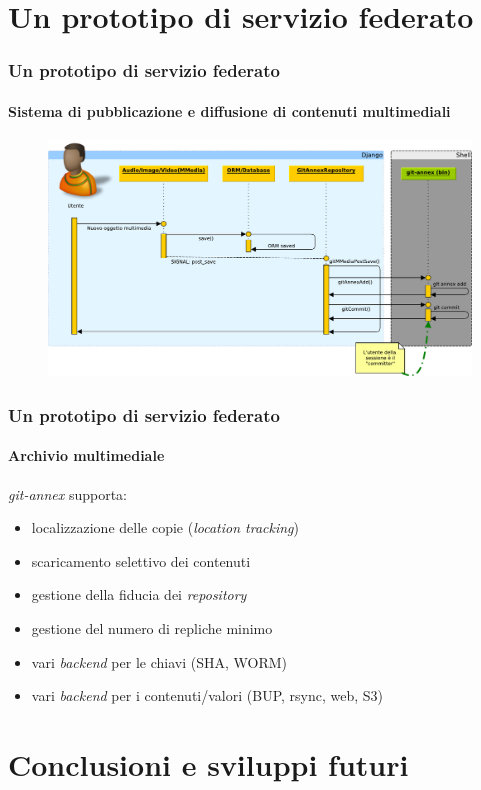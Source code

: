 \documentclass{beamer}
\begin{document}
\section{Un prototipo di servizio federato}

\begin{frame}
  \frametitle{Un prototipo di servizio federato}
  \framesubtitle{Sistema di pubblicazione e diffusione di contenuti multimediali}
	\begin{figure}
		\includegraphics[width=\textwidth]{./Figure/SequenceDiagram_NuovoOggetto-crop.pdf}
	\end{figure}
\end{frame}

\begin{frame}
  \frametitle{Un prototipo di servizio federato}
  \framesubtitle{Archivio multimediale}
\emph{git-annex} supporta:
\begin{itemize}
\item localizzazione delle copie (\emph{location tracking})
\item scaricamento selettivo dei contenuti
\item gestione della fiducia dei \emph{repository}
\item gestione del numero di repliche minimo
\item vari \emph{backend} per le chiavi (SHA, WORM)
\item vari \emph{backend} per i contenuti/valori (BUP, rsync, web, S3)
\end{itemize}

\end{frame}

\section{Conclusioni e sviluppi futuri}
\end{document}
